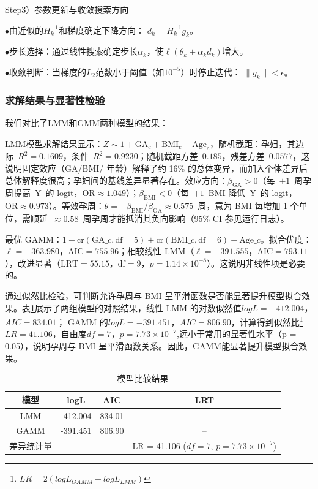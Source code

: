 Step3）参数更新与收敛搜索方向 

$\bullet$由近似的$H_k^{-1}$和梯度确定下降方向：
\(d_k = H_k^{-1} g_k\)。

$\bullet$步长选择：通过线性搜索确定步长\(\alpha_k\)，使\(\ell(\theta_k + \alpha_k d_k)\)增大。

$\bullet$收敛判断：当梯度的\(L_2\)范数小于阈值（如\(10^{-5}\)）时停止迭代：
\(\|g_k\| < \epsilon\)。

\subsubsection{求解结果与显著性检验}

我们对比了LMM和GMM两种模型的结果：

LMM模型求解结果显示：\(Z \sim 1 + \text{GA}_c + \text{BMI}_c + \text{Age}_c\)，随机截距：孕妇，其边际 \(R^2 = 0.1609\)，条件 \(R^2 = 0.9230\)；随机截距方差 \(0.185\)，残差方差 \(0.0577\)，这说明固定效应（GA/BMI/ 年龄）解释了约 16\% 的总体变异，而加入个体差异后总体解释度很高；孕妇间的基线差异显著存在。效应方向：\(\beta_{\text{GA}} > 0\)（每 \(+1\) 周孕周提高 Y 的 logit，\(\text{OR} \approx 1.049\)）；\(\beta_{\text{BMI}} < 0\)（每 \(+1\) BMI 降低 Y 的 logit，\(\text{OR} \approx 0.973\)）。等效孕周：\(\theta = -\beta_{\text{BMI}} / \beta_{\text{GA}} \approx 0.575\) 周，意为 BMI 每增加 1 个单位，需顺延 \(\approx 0.58\) 周孕周才能抵消其负向影响（95\% CI 参见运行日志）。

最优 GAMM：\(1 + \text{cr}(\text{GA}\_c, \text{df}=5) + \text{cr}(\text{BMI}\_c, \text{df}=6) + \text{Age}\_c\)。拟合优度：\(\ell = -363.980\)，\(\text{AIC}=755.96\)；相较线性 LMM（\(\ell = -391.555\)，\(\text{AIC}=793.11\)），改进显著（\(\text{LRT}=55.15\)，\(\text{df}=9\)，\(p=1.14 \times 10^{-8}\)）。这说明非线性项是必要的。

通过似然比检验，可判断允许孕周与 BMI 呈平滑函数是否能显著提升模型拟合效果。表\ref{tab:model_comparison}展示了两组模型的对照结果，线性 LMM 的对数似然值\(log L=-412.004\)，\(AIC = 834.01\)； GAMM 的\(log L=-391.451\)，\(AIC = 806.90\)，计算得到似然比\footnote{\(LR = 2(log L_{GAMM}-log L_{LMM})\)}\(LR = 41.106\)，自由度\(df = 7\)，\(p=7.73\times10^{-7}\),远小于常用的显著性水平（p = 0.05），说明孕周与 BMI 呈平滑函数关系。因此，GAMM能显著提升模型拟合效果。
\begin{table}[htbp]
  \centering
  \caption{模型比较结果}
  \begin{tabular}{cccc}
    \toprule
    模型 & logL & AIC & LRT \\
    \midrule
    LMM & -412.004 & 834.01 & -- \\
    GAMM & -391.451 & 806.90 & -- \\
    \midrule
    差异统计量 & -- & -- & LR = 41.106 ($df=7$, $p=7.73\times10^{-7}$) \\
    \bottomrule
  \end{tabular}
  \label{tab:model_comparison}
\end{table}

